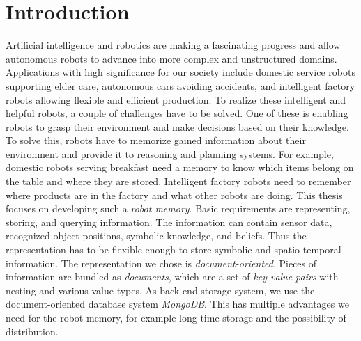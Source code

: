 \chapter{Introduction}
\label{chap:introduction}
Artificial intelligence and robotics are making a fascinating progress
and allow autonomous robots to advance into more complex and
unstructured domains.
Applications with high significance for our society include domestic
service robots supporting elder care, autonomous cars avoiding
accidents, and intelligent factory robots allowing flexible and
efficient production. To realize these intelligent and helpful robots,
a couple of challenges have to be solved. One of these is enabling
robots to grasp their environment and make decisions based on their
knowledge. To solve this, robots have to memorize gained information
about their environment and provide it to reasoning and planning
systems. For example, domestic robots serving breakfast need a memory
to know which items belong on the table and where they are
stored. Intelligent factory robots need to remember where products are
in the factory and what other robots are doing.
%
This thesis focuses on developing such a \emph{robot memory}. Basic
requirements are representing, storing, and querying information. The
information can contain sensor data, recognized object positions,
symbolic knowledge, and beliefs. Thus the representation has to be
flexible enough to store symbolic and spatio-temporal information. The
representation we chose is \emph{document-oriented}. Pieces of
information are bundled as \emph{documents}, which are a set of
\emph{key-value pairs} with nesting and various value types. As
back-end storage system, we use the document-oriented database system
\emph{MongoDB}. This has multiple advantages we need for the robot
memory, for example long time storage and the possibility of
distribution.

